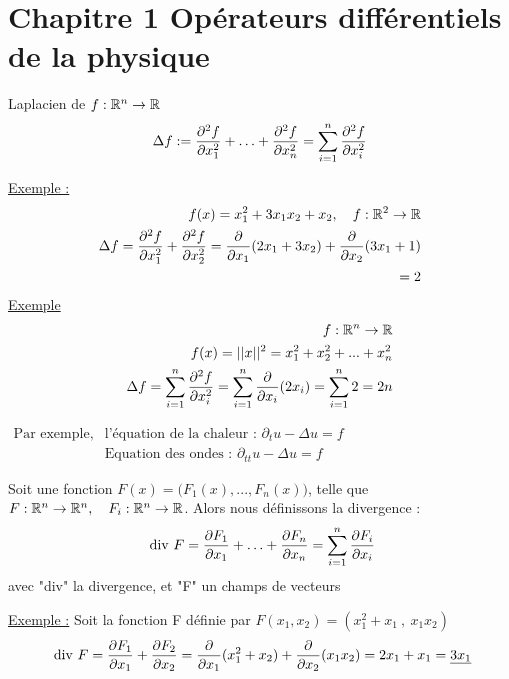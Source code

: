 \documentclass[12pt,a4paper]{article}
\begin{document}
\section[Opérateurs diff. de la physique]{Chapitre 1 Opérateurs différentiels de la physique}
\begin{boite}
	 Laplacien de $f : \rn \to \R$
	\begin{equation*}
		\Delta f := \frac{\partial^2 f}{\partial x_1^2} + \ldots + \frac{\partial^2 f}{\partial x_n^2} = \somme{n}{i=1} \frac{\partial^2 f}{\partial x_i^2}
	\end{equation*}
\end{boite}
\uline{Exemple :} 
\begin{align*}
	f(x) = x_1^2 + 3x_1x_2 + x_2, \quad f : \R^2 \to \R\\
	\Delta f = \frac{\partial^2 f}{\partial x_1^2} + \frac{\partial^2 f}{\partial x_2^2} = \frac{\partial}{\partial x_1}(2x_1 + 3x_2) +  \frac{\partial }{\partial x_2}(3x_1 + 1)\\
	=2
\end{align*}
\uline{Exemple}
\begin{align*}
	f: \rn \to \R\\
	f(x) = ||x||^2 = x_1^2 + x_2^2 + ... + x_n^2\\
	\Delta f = \somme{n}{i=1} \frac{\partial^2 f}{\partial x_i^2} = \somme{n}{i=1} \frac{\partial}{\partial x_i}(2x_i) = \somme{n}{i=1} 2 = 2n
\end{align*}

$\begin{array}{ll}
	\mbox{Par exemple,} & \mbox{l'équation de la chaleur : }\partial_t u - \Delta u = f\\
						& \mbox{Equation des ondes : }\partial_{tt} u - \Delta u = f
\end{array}$ 

\begin{boite}
	 Soit une fonction $F(x) = \big(F_1(x),...,F_n(x)\big)$, telle que $F : \rn \to \rn,\quad F_i : \rn \to \R$. Alors nous définissons la divergence :
	\begin{equation*}
		\text{\dive } F = \frac{\partial F_1}{\partial x_1} +  \ldots + \frac{\partial F_n}{\partial x_n} = \somme{n}{i=1} \frac{\partial F_i}{\partial x_i}
	\end{equation*}
	avec "div" la divergence, et "F" un champs de vecteurs
\end{boite}
\uline{Exemple :} Soit la fonction F définie par $F(x_1,x_2) = (x_1^2 + x_1\ , \ x_1x_2)$
\begin{equation*} 	
	\dive F = \frac{\partial F_1}{\partial x_1} + \frac{\partial F_2}{\partial x_2} = \frac{\partial}{\partial x_1}(x_1^2 + x_2) + \frac{\partial }{\partial x_2}(x_1x_2)= 2x_1 + x_1 = \uline{3x_1}
\end{equation*}
\end{document}
